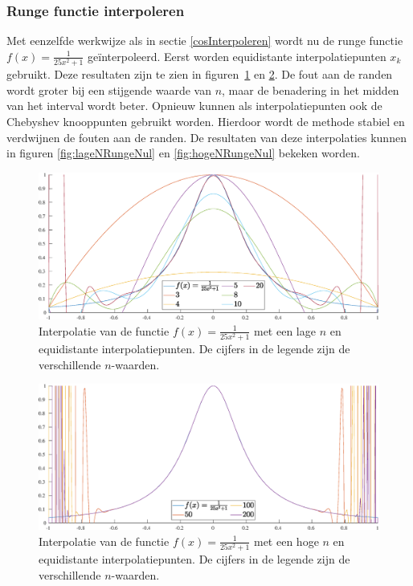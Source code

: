 \documentclass[a4paper, 12pt, titlepage, fleqn]{article}
\begin{document}
\newpage
\subsubsection{Runge functie interpoleren}
Met eenzelfde werkwijze als in sectie \ref{cosInterpoleren} wordt nu de runge functie $f(x) = \frac{1}{25x^2+1}$ ge\"interpoleerd. Eerst worden equidistante interpolatiepunten $x_k$ gebruikt. Deze resultaten zijn te zien in figuren~\ref{fig:lageNRungeEqui} en \ref{fig:hogeNRungeEqui}. De fout aan de randen wordt groter bij een stijgende waarde van $n$, maar de benadering in het midden van het interval wordt beter.  Opnieuw kunnen als interpolatiepunten ook de Chebyshev knooppunten gebruikt worden. Hierdoor wordt de methode stabiel en verdwijnen de fouten aan de randen. De resultaten van deze interpolaties kunnen in figuren \ref{fig:lageNRungeNul} en \ref{fig:hogeNRungeNul} bekeken worden.

\begin{figure}
\centering
\includegraphics[scale=0.4]{../Afbeeldingen/runge_equi_laag.eps}
\caption{Interpolatie van de functie $f(x) = \frac{1}{25x^2+1}$ met een lage $n$ en equidistante interpolatiepunten. De cijfers in de legende zijn de verschillende $n$-waarden.}
\label{fig:lageNRungeEqui}
\end{figure}

\begin{figure}
\centering
\includegraphics[scale=0.4]{../Afbeeldingen/runge_equi_hoog.eps}
\caption{Interpolatie van de functie $f(x) = \frac{1}{25x^2+1}$ met een hoge $n$ en equidistante interpolatiepunten. De cijfers in de legende zijn de verschillende $n$-waarden.}
\label{fig:hogeNRungeEqui}
\end{figure}
\end{document}
